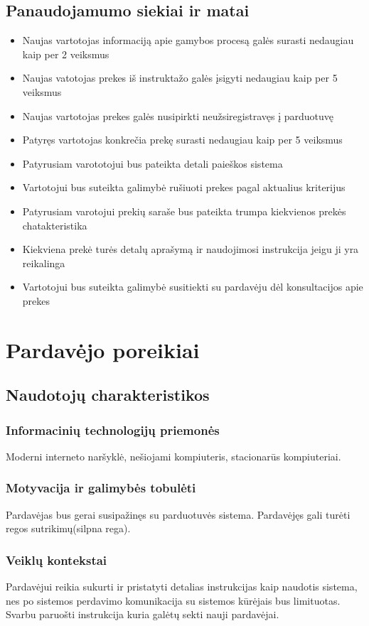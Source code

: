 \documentclass[oneside]{VUMIFPSkursinis}
\begin{document}
	\subsection{Panaudojamumo siekiai ir matai}
		\begin{itemize}
			\item{Naujas vartotojas informaciją apie gamybos procesą galės surasti nedaugiau kaip per 2 veiksmus}
			\item{Naujas vatotojas prekes iš instruktažo galės įsigyti nedaugiau kaip per 5 veiksmus}
			\item{Naujas vartotojas prekes galės nusipirkti neužsiregistravęs į parduotuvę}
			\item{Patyręs vartotojas konkrečia prekę surasti nedaugiau kaip per 5 veiksmus}
			\item{Patyrusiam varototojui bus pateikta detali paieškos sistema}
			\item{Vartotojui bus suteikta galimybė rušiuoti prekes pagal aktualius kriterijus}
			\item{Patyrusiam varotojui prekių saraše bus pateikta trumpa kiekvienos prekės chatakteristika}
			\item{Kiekviena prekė turės detalų aprašymą ir naudojimosi instrukcija jeigu ji yra reikalinga}
			\item{Vartotojui bus suteikta galimybė susitiekti su pardavėju dėl konsultacijos apie prekes}
		\end{itemize}

\section{Pardavėjo poreikiai}
	\subsection{Naudotojų charakteristikos}
		\subsubsection{Informacinių technologijų priemonės}
			Moderni interneto naršyklė, nešiojami kompiuteris, stacionarūs kompiuteriai.
		\subsubsection{Motyvacija ir galimybės tobulėti}
			Pardavėjas bus gerai susipažinęs su parduotuvės sistema. Pardavėjęs gali turėti regos sutrikimų(silpna rega).
		\subsubsection{Veiklų kontekstai}
			Pardavėjui reikia sukurti ir pristatyti detalias instrukcijas kaip naudotis sistema, nes po sistemos perdavimo komunikacija su sistemos kūrėjais bus limituotas. Svarbu paruošti instrukcija kuria galėtų sekti nauji pardavėjai.
\end{document}
